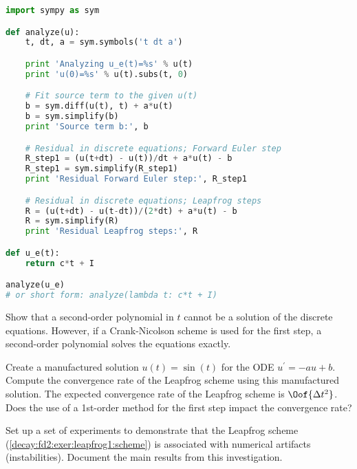 \documentclass[graybox,sectrefs,envcountresetchap,open=right,final]{svmonodo}
\newenvironment{doconceexercise}{}{}
\begin{document}
\begin{doconceexercise}
\begin{lstlisting}[language=python,style=blue1_bluegreen]
import sympy as sym

def analyze(u):
    t, dt, a = sym.symbols('t dt a')

    print 'Analyzing u_e(t)=%s' % u(t)
    print 'u(0)=%s' % u(t).subs(t, 0)

    # Fit source term to the given u(t)
    b = sym.diff(u(t), t) + a*u(t)
    b = sym.simplify(b)
    print 'Source term b:', b

    # Residual in discrete equations; Forward Euler step
    R_step1 = (u(t+dt) - u(t))/dt + a*u(t) - b
    R_step1 = sym.simplify(R_step1)
    print 'Residual Forward Euler step:', R_step1

    # Residual in discrete equations; Leapfrog steps
    R = (u(t+dt) - u(t-dt))/(2*dt) + a*u(t) - b
    R = sym.simplify(R)
    print 'Residual Leapfrog steps:', R

def u_e(t):
    return c*t + I

analyze(u_e)
# or short form: analyze(lambda t: c*t + I)

\end{lstlisting}




Show that a second-order polynomial in $t$ cannot be a solution of the discrete
equations. However, if a Crank-Nicolson scheme is used for the first
step, a second-order polynomial solves the equations exactly.


Create a manufactured solution $u(t)=\sin(t)$ for the ODE
$u^{\prime}=-au+b$.
Compute the convergence rate of the Leapfrog scheme using this
manufactured solution. The expected convergence rate of the
Leapfrog scheme is $\Oof{\Delta t^2}$. Does the use of a
1st-order method for the first step impact the convergence rate?



Set up a set of experiments to demonstrate that the Leapfrog scheme
(\ref{decay:fd2:exer:leapfrog1:scheme}) is associated with numerical artifacts
(instabilities). Document the main results from this investigation.


\end{doconceexercise}
\end{document}

